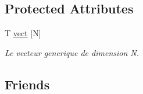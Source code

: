 \subsection*{Protected Attributes}
\begin{DoxyCompactItemize}
\item 
T \hyperlink{class_vecteur_a2c2224d33b1b96b4cb75f010d5ec1d97}{vect} \mbox{[}N\mbox{]}
\begin{DoxyCompactList}\small\item\em Le vecteur generique de dimension {\itshape N}. \end{DoxyCompactList}\end{DoxyCompactItemize}
\subsection*{Friends}
